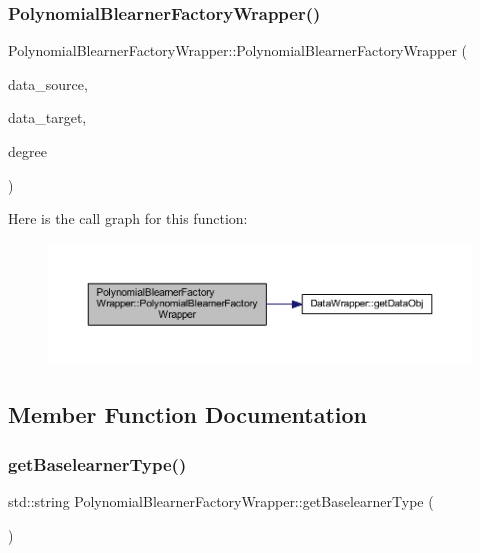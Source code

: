 \subsubsection{\texorpdfstring{Polynomial\+Blearner\+Factory\+Wrapper()}{PolynomialBlearnerFactoryWrapper()}}
{\footnotesize\ttfamily Polynomial\+Blearner\+Factory\+Wrapper\+::\+Polynomial\+Blearner\+Factory\+Wrapper (\begin{DoxyParamCaption}\item[{\mbox{\hyperlink{class_data_wrapper}{Data\+Wrapper}} \&}]{data\+\_\+source,  }\item[{\mbox{\hyperlink{class_data_wrapper}{Data\+Wrapper}} \&}]{data\+\_\+target,  }\item[{const unsigned int \&}]{degree }\end{DoxyParamCaption})\hspace{0.3cm}{\ttfamily [inline]}}

Here is the call graph for this function\+:\nopagebreak
\begin{figure}[H]
\begin{center}
\leavevmode
\includegraphics[width=350pt]{class_polynomial_blearner_factory_wrapper_aff6c82400439d55fa1e9b1827089c461_cgraph}
\end{center}
\end{figure}


\subsection{Member Function Documentation}
\mbox{\label{class_polynomial_blearner_factory_wrapper_afc3c4e2e5b3aa482cdb6e8fad0180442}} 
\subsubsection{\texorpdfstring{get\+Baselearner\+Type()}{getBaselearnerType()}}
{\footnotesize\ttfamily std\+::string Polynomial\+Blearner\+Factory\+Wrapper\+::get\+Baselearner\+Type (\begin{DoxyParamCaption}{ }\end{DoxyParamCaption})\hspace{0.3cm}{\ttfamily [inline]}}

